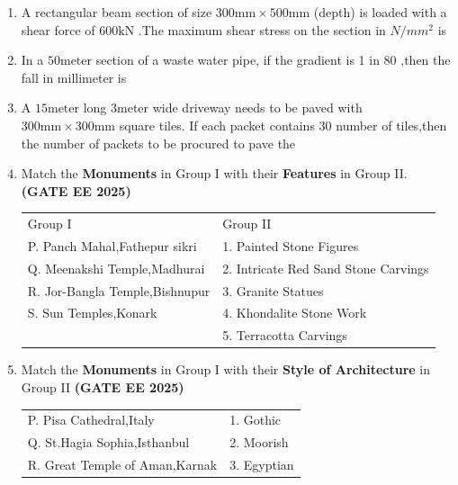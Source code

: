 \documentclass[journal,12pt,onecolumn]{IEEEtran}
\theoremstyle{remark}
\begin{document}
\begin{enumerate}
\begin{enumerate}
\end{enumerate}
\item A rectangular beam section of size $300\text{mm} \times 500\text{mm}$ (depth) is loaded with a shear force of $600\text{kN}$ .The maximum shear stress on the section in $N/mm^2$ is \underline{\makebox[2cm]{\hfill}}
\item In a $50\text{meter}$ section of a waste water pipe, if the gradient is 1 in 80 ,then the fall in millimeter is \underline{\makebox[2cm]{\hfill}}
\item A $15\text{meter}$ long $3\text{meter}$ wide driveway needs to be paved with $300\text{mm} \times 300\text{mm}$ square tiles. If each packet contains 30 number of tiles,then the number of packets to be procured to pave the 
\item Match the \textbf{Monuments} in Group I with their \textbf{Features} in Group II. \hfill \textbf{(GATE EE 2025)}
\begin{tabular}{p{}p{}}
Group I  & Group II \\
P. Panch Mahal,Fathepur sikri     & 1. Painted Stone Figures \\
Q. Meenakshi Temple,Madhurai     & 2. Intricate Red Sand Stone Carvings\\
R. Jor-Bangla Temple,Bishnupur  & 3. Granite Statues\\
S. Sun Temples,Konark     & 4. Khondalite Stone Work\\
     & 5. Terracotta Carvings\\
\end{tabular}
\begin{enumerate}
\end{enumerate}
\item Match the \textbf{Monuments} in Group I with their \textbf{Style of Architecture} in Group II \hfill \textbf{(GATE EE 2025)}
\begin{tabular}{p{}p{}}
P. Pisa Cathedral,Italy     & 1. Gothic \\
Q. St.Hagia Sophia,Isthanbul     & 2. Moorish\\
R. Great Temple of Aman,Karnak & 3. Egyptian\\

\end{tabular}
\end{enumerate}
\end{document}
